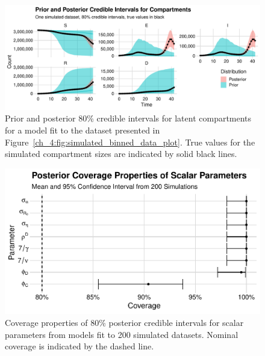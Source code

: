 \begin{figure}[htbp]
    \centering
    \includegraphics[width=1.0\columnwidth]{single_generated_quantities_simulation_compartment_plot}
    \caption{Prior and posterior 80\% credible intervals for latent compartments for a model fit to the dataset presented in Figure~\ref{ch_4:fig:simulated_binned_data_plot}.
    True values for the simulated compartment sizes are indicated by solid black lines.}
    \label{ch_4:fig:single_generated_quantities_simulation_compartment_plot}
\end{figure}

\begin{figure}[htbp]
    \centering
    \includegraphics[width=1.0\columnwidth]{generated_quantities_simulation_scalar_coverage_plot}
    \caption{Coverage properties of 80\% posterior credible intervals for scalar parameters from models fit to 200 simulated datasets.
    Nominal coverage is indicated by the dashed line.}
    \label{ch_4:fig:generated_quantities_simulation_scalar_coverage_plot}
\end{figure}

